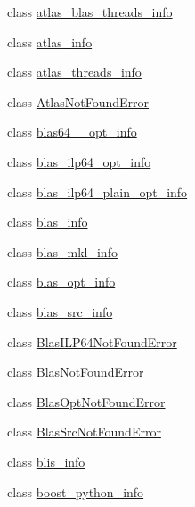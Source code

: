 \begin{DoxyCompactItemize}
class \hyperlink{classnumpy_1_1distutils_1_1system__info_1_1atlas__blas__threads__info}{atlas\+\_\+blas\+\_\+threads\+\_\+info}
\item 
class \hyperlink{classnumpy_1_1distutils_1_1system__info_1_1atlas__info}{atlas\+\_\+info}
\item 
class \hyperlink{classnumpy_1_1distutils_1_1system__info_1_1atlas__threads__info}{atlas\+\_\+threads\+\_\+info}
\item 
class \hyperlink{classnumpy_1_1distutils_1_1system__info_1_1AtlasNotFoundError}{Atlas\+Not\+Found\+Error}
\item 
class \hyperlink{classnumpy_1_1distutils_1_1system__info_1_1blas64____opt__info}{blas64\+\_\+\+\_\+opt\+\_\+info}
\item 
class \hyperlink{classnumpy_1_1distutils_1_1system__info_1_1blas__ilp64__opt__info}{blas\+\_\+ilp64\+\_\+opt\+\_\+info}
\item 
class \hyperlink{classnumpy_1_1distutils_1_1system__info_1_1blas__ilp64__plain__opt__info}{blas\+\_\+ilp64\+\_\+plain\+\_\+opt\+\_\+info}
\item 
class \hyperlink{classnumpy_1_1distutils_1_1system__info_1_1blas__info}{blas\+\_\+info}
\item 
class \hyperlink{classnumpy_1_1distutils_1_1system__info_1_1blas__mkl__info}{blas\+\_\+mkl\+\_\+info}
\item 
class \hyperlink{classnumpy_1_1distutils_1_1system__info_1_1blas__opt__info}{blas\+\_\+opt\+\_\+info}
\item 
class \hyperlink{classnumpy_1_1distutils_1_1system__info_1_1blas__src__info}{blas\+\_\+src\+\_\+info}
\item 
class \hyperlink{classnumpy_1_1distutils_1_1system__info_1_1BlasILP64NotFoundError}{Blas\+I\+L\+P64\+Not\+Found\+Error}
\item 
class \hyperlink{classnumpy_1_1distutils_1_1system__info_1_1BlasNotFoundError}{Blas\+Not\+Found\+Error}
\item 
class \hyperlink{classnumpy_1_1distutils_1_1system__info_1_1BlasOptNotFoundError}{Blas\+Opt\+Not\+Found\+Error}
\item 
class \hyperlink{classnumpy_1_1distutils_1_1system__info_1_1BlasSrcNotFoundError}{Blas\+Src\+Not\+Found\+Error}
\item 
class \hyperlink{classnumpy_1_1distutils_1_1system__info_1_1blis__info}{blis\+\_\+info}
\item 
class \hyperlink{classnumpy_1_1distutils_1_1system__info_1_1boost__python__info}{boost\+\_\+python\+\_\+info}

\end{DoxyCompactItemize}
